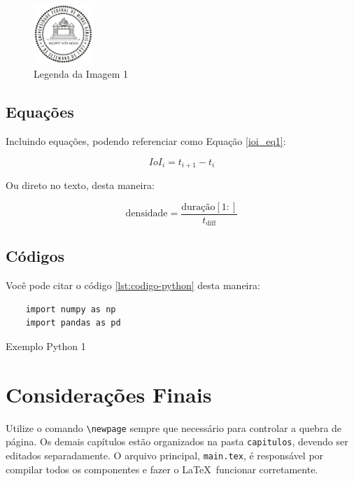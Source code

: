 \begin{figure}[h]
    \centering
\includegraphics[width=0.2\textwidth]{arquivos/pre-texto/Logo_UFMG.png}
    \caption{Legenda da Imagem 1}
    \label{fig1}
\end{figure}



\subsection{Equações}
Incluindo equações, podendo referenciar como Equação  \ref{ioi_eq1}:

\begin{equation}\label{ioi_eq1}
    IoI_i = t_{i+1} - t_i
\end{equation}

Ou direto no texto, desta maneira:


\[
\text{densidade} = \frac{\text{duração}[1:]}{t_{\text{diff}}}
\]

\vspace{1.5em}


\subsection{Códigos}
Você pode citar o código \ref{lst:codigo-python} desta maneira:


\begin{listing}[h!]
    \centering
    \begin{verbatim}
    import numpy as np 
    import pandas as pd  
    \end{verbatim}
    \caption{Exemplo Python 1}
    \label{lst:codigo-python}
    \end{listing}
    

\newpage

\section{Considerações Finais}

Utilize o comando \texttt{\textbackslash newpage} sempre que necessário para controlar a quebra de página.  
Os demais capítulos estão organizados na pasta \texttt{capitulos}, devendo ser editados separadamente.  
O arquivo principal, \texttt{main.tex}, é responsável por compilar todos os componentes e fazer o \LaTeX\ funcionar corretamente.

